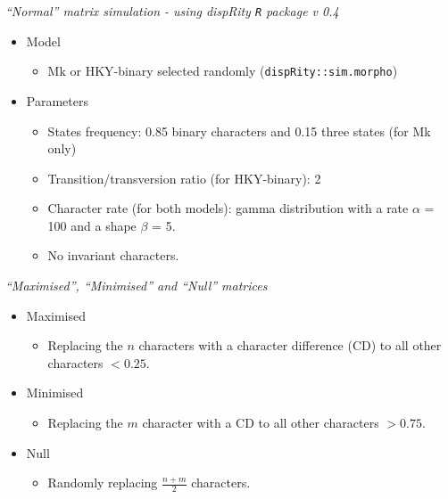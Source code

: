\documentclass[12pt,letterpaper]{article}
\renewcommand{\subsection}[1]{%
\bigskip
\begin{center}
\begin{large}
\normalfont\itshape #1
\end{large}
\end{center}}
\begin{document}
\subsection{``Normal'' matrix simulation - using dispRity \texttt{R} package v 0.4 \cite{thomas_guillerme_2016_55646}}
\begin{itemize}
  \item Model
  \begin{itemize}
    \item Mk or HKY-binary selected randomly (\texttt{dispRity::sim.morpho})
  \end{itemize}
  \item Parameters
  \begin{itemize}
    \item States frequency: 0.85 binary characters and 0.15 three states (for Mk only)
    \item Transition/transversion ratio (for HKY-binary): 2 
    \item Character rate (for both models): gamma distribution with a rate $\alpha$ = 100 and a shape $\beta$ = 5.
    \item No invariant characters.
  \end{itemize}
\end{itemize}

\subsection{``Maximised'', ``Minimised'' and ``Null'' matrices}
\begin{itemize}
  \item Maximised
  \begin{itemize}
    \item Replacing the $n$ characters with a character difference (CD) to all other characters $< 0.25$.
  \end{itemize}

  \item Minimised
  \begin{itemize}
    \item Replacing the $m$ character with a CD to all other characters $> 0.75$.
  \end{itemize}

  \item Null
  \begin{itemize}
    \item Randomly replacing $\frac{n+m}{2}$ characters.
  \end{itemize}

\end{itemize}
\end{document}
